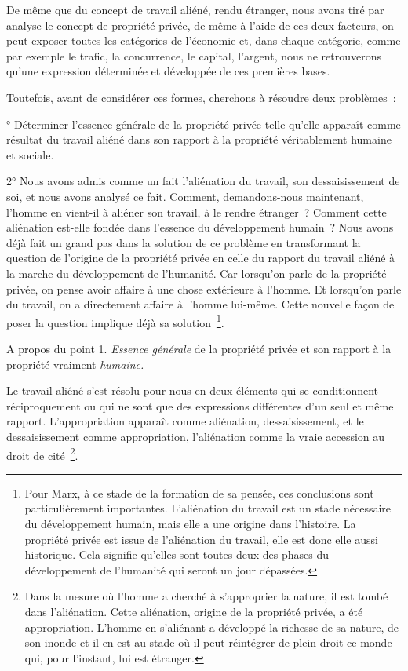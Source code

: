 \documentclass[french,twoside]{book} %
\begin{document}
De même que du concept de travail aliéné, rendu étranger, nous avons tiré par analyse le concept de propriété privée, de même à l’aide de ces deux facteurs, on peut exposer toutes les catégories de l’économie et, dans chaque catégorie, comme par exemple le trafic, la concurrence, le capital, l’argent, nous ne retrouverons qu’une expression déterminée et développée de ces premières bases.\par
Toutefois, avant de considérer ces formes, cherchons à résoudre deux problèmes :\par
\bigbreak
{}° Déterminer l’essence générale de la propriété privée telle qu’elle apparaît comme résultat du travail aliéné dans son rapport à la propriété véritablement humaine et sociale.\par
2° Nous avons admis comme un fait l’aliénation du travail, son dessaisissement de soi, et nous avons analysé ce fait. Comment, demandons-nous maintenant, l’homme en vient-il à aliéner son travail, à le rendre étranger ? Comment cette aliénation est-elle fondée dans l’essence du développement humain ? Nous avons déjà fait un grand pas dans la solution de ce problème en transformant la question de l’origine de la propriété privée en celle du rapport du travail aliéné à la marche du développement de l’humanité. Car lorsqu’on parle de la propriété privée, on pense avoir affaire à une chose extérieure à l’homme. Et lorsqu’on parle du travail, on a directement affaire à l’homme lui-même. Cette nouvelle façon de poser la question implique déjà sa solution \footnote{Pour Marx, à ce stade de la formation de sa pensée, ces conclusions sont particulièrement importantes. L’aliénation du travail est un stade nécessaire du développement humain, mais elle a une origine dans l’histoire. La propriété privée est issue de l’aliénation du travail, elle est donc elle aussi historique. Cela signifie qu’elles sont toutes deux des phases du développement de l’humanité qui seront un jour dépassées.}.\par
A propos du point 1. \emph{Essence générale} de la propriété privée et son rapport à la propriété vraiment \emph{humaine.}\par
Le travail aliéné s’est résolu pour nous en deux éléments qui se conditionnent réciproquement ou qui ne sont que des expressions différentes d’un seul et même rapport. L’appropriation apparaît comme aliénation, dessaisissement, et le dessaisissement comme appropriation, l’aliénation comme la vraie accession au droit de cité \footnote{Dans la mesure où l’homme a cherché à s’approprier la nature, il est tombé dans l’aliénation. Cette aliénation, origine de la propriété privée, a été appropriation. L’homme en s’aliénant a développé la richesse de sa nature, de son inonde et il en est au stade où il peut réintégrer de plein droit ce monde qui, pour l’instant, lui est étranger.}.\par
\end{document}
